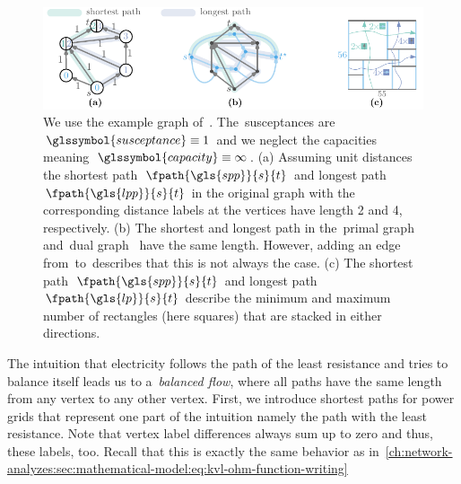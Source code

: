 \begin{figure}[t!]
    \includegraphics[page=1]{networkAnalyzes/figures/Property-of-Balancing.pdf}
    \caption[The property of balancing.]{We use the example graph
    of~\textcite[p.18]{Fel13}. The~\textcolor{SUSCEPTANCE}{susceptances
    are~$\glssymbol{susceptance}\equiv 1$} and we neglect the capacities
    meaning~\textcolor{CAPACITY}{$\glssymbol{capacity}\equiv\infty$}. (a)
    Assuming unit distances the \textcolor{KITgreen70}{shortest
    path~$\fpath{\gls{spp}}{\source}{\sink}$} and \textcolor{KITblue70}{longest
    path~$\fpath{\gls{lpp}}{\source}{\sink}$} in the original graph with the
    corresponding distance labels at the vertices have length
    \textcolor{KITgreen70}{2} and \textcolor{KITblue70}{4}, respectively. (b)
    The \textcolor{KITgreen70}{shortest} and \textcolor{KITblue70}{longest} path
    in the~\textcolor{PRIMALGRAPH}{primal graph~}
    and~\textcolor{DUALGRAPH}{dual graph~} have the same
    length. However, adding an edge from~\source to~\sink describes that this is
    not always the case. (c) The \textcolor{KITgreen70}{shortest path~$
    \fpath{\gls{spp}}{\source}{\sink}$} and
    \textcolor{KITblue70}{longest path~$\fpath{\gls{lp}}{\source}{\sink}$}
    describe the \textcolor{KITgreen70}{minimum} and \textcolor{KITblue70}
    {maximum} number of rectangles (here squares) that are stacked in either
    directions.}
    \label{ch:network-analyzes:fig:LongestVsShortestPathAnalogies}
\end{figure}
% 
The intuition that electricity follows the path of the least resistance and
tries to balance itself leads us to a~\emph{balanced flow}, where all paths have
the same length from any vertex to any other vertex. First, we introduce
shortest paths for power grids that represent one part of the intuition namely
the path with the least resistance. Note that vertex label differences always
sum up to zero and thus, these labels, too. Recall that this is exactly the same
behavior as
in~\cref{ch:network-analyzes:sec:mathematical-model:eq:kvl-ohm-function-writing}
